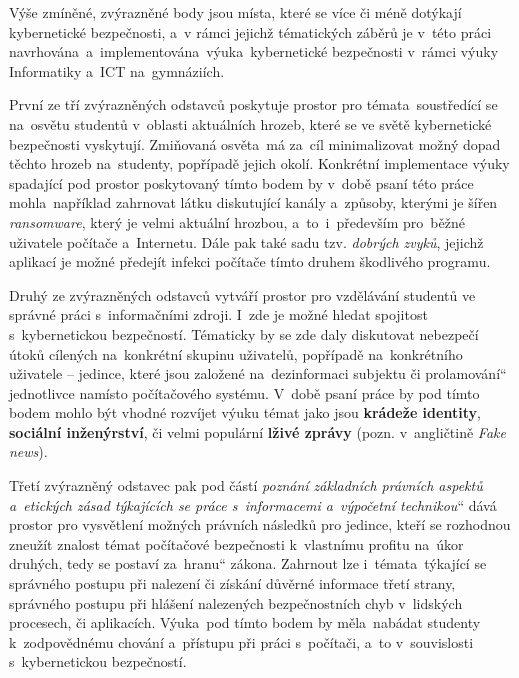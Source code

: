 \documentclass[a4paper, 12pt]{article}
\providecommand{\uv}[1]{\quotedblbase #1\textquotedblleft}
\begin{document}
Výše zmíněné, zvýrazněné body jsou místa, které se více či méně dotýkají kybernetické bezpečnosti, a~v rámci jejichž tématických záběrů je v~této práci navrhována~a~implementována~výuka~kybernetické bezpečnosti v~rámci výuky Informatiky a~ICT na~gymnáziích.
 
První ze tří zvýrazněných odstavců poskytuje prostor pro témata~soustředící se na~osvětu studentů v~oblasti aktuálních hrozeb, které se ve světě kybernetické bezpečnosti vyskytují. Zmiňovaná osvěta~má za~cíl minimalizovat možný dopad těchto hrozeb na~studenty, popřípadě jejich okolí. Konkrétní implementace výuky spadající pod prostor poskytovaný tímto bodem by v~době psaní této práce mohla~například zahrnovat látku diskutující kanály a~způsoby, kterými je šířen \textit{ransomware}, který je velmi aktuální hrozbou, a~to~i~především pro~běžné uživatele počítače a~Internetu. Dále pak také sadu tzv. \textit{dobrých zvyků}, jejichž aplikací je možné předejít infekci počítače tímto druhem škodlivého programu.

Druhý ze zvýrazněných odstavců vytváří prostor pro vzdělávání studentů ve správné práci s~informačními zdroji. I~zde je možné hledat spojitost s~kybernetickou bezpečností. Tématicky by se zde daly diskutovat nebezpečí útoků cílených na~konkrétní skupinu uživatelů, popřípadě na~konkrétního uživatele -- jedince, které jsou založené na~dezinformaci subjektu či \uv{prolamování} jednotlivce namísto počítačového systému. V~době psaní práce by pod tímto bodem mohlo být vhodné rozvíjet výuku témat jako jsou \textbf{krádeže identity}, \textbf{sociální inženýrství}, či velmi populární \textbf{lživé zprávy} (pozn. v~angličtině \textit{Fake news}).

Třetí zvýrazněný odstavec pak pod částí \uv{\textit{poznání základních právních aspektů a~etických zásad týkajících se práce s~informacemi a~výpočetní technikou}} dává prostor pro vysvětlení možných právních následků pro jedince, kteří se rozhodnou zneužít znalost témat počítačové bezpečnosti k~vlastnímu profitu na~úkor druhých, tedy se postaví za~\uv{hranu} zákona. Zahrnout lze i~témata~týkající se správného postupu při nalezení či získání důvěrné informace třetí strany, správného postupu při hlášení nalezených bezpečnostních chyb v~lidských procesech, či aplikacích. Výuka~pod tímto bodem by měla~nabádat studenty k~zodpovědnému chování a~přístupu při práci s~počítači, a~to v~souvislosti s~kybernetickou bezpečností.
\end{document}
